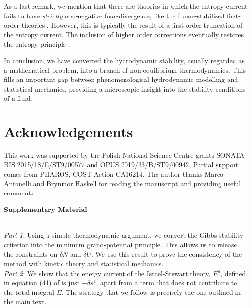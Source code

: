 \documentclass[a4paper, amsfonts, amssymb, amsmath, reprint, showkeys, nofootinbib, twoside, onecolumn,notitlepage]{revtex4-1}
\newcommand{\riga}{\textcolor{white}{-}}
\begin{document}
As a last remark, we mention that there are theories in which the entropy current fails to have \textit{strictly} non-negative four-divergence, like the frame-stabilised first-order theories \cite{Kovtun2019,Shokri2020,BemficaDNDefinitivo2020}. However, this is typically the result of a first-order truncation of the entropy current. The inclusion of higher order corrections eventually restores the entropy principle \cite{Noronha2021}.


In conclusion, we have converted the hydrodynamic stability, usually regarded as a mathematical problem, into a branch of non-equilibrium thermodynamics. This fills an important gap between phenomenological hydrodynamic
modelling and statistical mechanics, providing a microscopic insight into the stability conditions of a fluid.\\







\section*{Acknowledgements}

This work was supported by the Polish National Science Centre grants SONATA BIS 2015/18/E/ST9/00577 and OPUS 2019/33/B/ST9/00942. Partial support comes from PHAROS, COST Action CA16214. The author thanks Marco Antonelli and Brynmor Haskell for reading the manuscript and providing useful comments.







\newpage


\begin{center}
\textbf{ \large Supplementary Material}
\end{center}
\riga\\

\textit{Part 1}: Using a simple thermodynamic argument, we convert the Gibbs stability criterion into the minimum grand-potential principle. This allows us to release the constraints on $\delta N$ and $\delta U$. We use this result to prove the consistency of the method with kinetic theory and statistical mechanics. \\


\textit{Part 2}: We show that the energy current of the Israel-Stewart theory, $E^a$, defined in equation (44) of \citet{Hishcock1983} is just  $- \delta s^a$, apart from a term that does not contribute to the total integral $E$. The strategy that we follow is precisely the one outlined in the main text.\\
\end{document}
